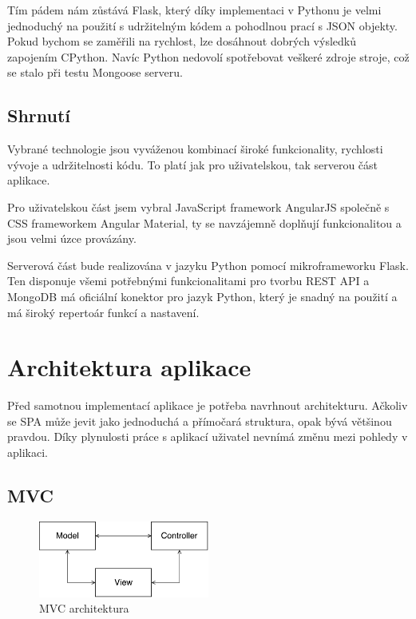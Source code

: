 Tím pádem nám zůstává Flask, který díky implementaci v Pythonu je velmi jednoduchý na použití s udržitelným kódem a pohodlnou prací s JSON objekty. Pokud bychom se zaměřili na rychlost, lze dosáhnout dobrých výsledků zapojením CPython. Navíc Python nedovolí spotřebovat veškeré zdroje stroje, což se stalo při testu Mongoose serveru.


\section{Shrnutí}

Vybrané technologie jsou vyváženou kombinací široké funkcionality, rychlosti vývoje a udržitelnosti kódu. To platí jak pro uživatelskou, tak serverou část aplikace.

Pro uživatelskou část jsem vybral JavaScript framework AngularJS společně s CSS frameworkem Angular Material, ty se navzájemně doplňují funkcionalitou a jsou velmi úzce provázány.

Serverová část bude realizována v jazyku Python pomocí mikroframeworku Flask. Ten disponuje všemi potřebnými funkcionalitami pro tvorbu REST API a MongoDB má oficiální konektor pro jazyk Python, který je snadný na použití a má široký repertoár funkcí a nastavení.

\chapter{Architektura aplikace}

Před samotnou implementací aplikace je potřeba navrhnout architekturu. Ačkoliv se SPA může jevit jako jednoduchá a přímočará struktura, opak bývá většinou pravdou. Díky plynulosti práce s aplikací uživatel nevnímá změnu mezi pohledy v aplikaci.

\label{architektura}

\section{MVC}
\label{sec:mvc}

\begin{figure}[h]
    \centering
    \includegraphics[width=0.5\textwidth]{fig/mvc.pdf}
    \caption{MVC architektura} \label{fig:mvc}
  
\end{figure}



